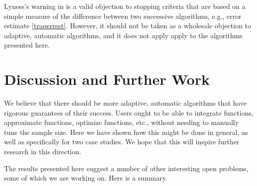 \documentclass[]{elsarticle}
\theoremstyle{definition}
\theoremstyle{remark}
\begin{document}
Lyness's warning in \cite{Lyn83} is a valid objection to stopping criteria that are based on a simple measure of the difference between two successive algorithms, e.g., error estimate \eqref{traperrest}. However, it should not be taken as a wholesale objection to adaptive, automatic algorithms, and it does not apply apply to the algorithms presented here.

\section{Discussion and Further Work} \label{furthersec}

We believe that there should be more adaptive, automatic algorithms that have rigorous guarantees of their success.  Users ought to be able to integrate functions, approximate functions, optimize functions, etc., without needing to manually tune the sample size.  Here we have shown how this might be done in general, as well as specifically for two case studies.  We hope that this will inspire further research in this direction.

The results presented here suggest a number of other interesting open problems, some of which we are working on.  Here is a summary.
\end{document}
